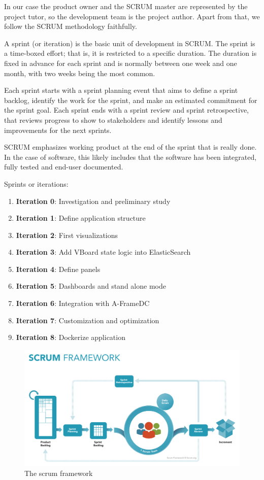 \documentclass[a4paper, 12pt]{book}
\begin{document}
In our case the product owner and the SCRUM master are represented by the project tutor, so the development team is the project author. Apart from that, we follow the SCRUM methodology faithfully.

A sprint (or iteration) is the basic unit of development in SCRUM. The sprint is a time-boxed effort; that is, it is restricted to a specific duration. The duration is fixed in advance for each sprint and is normally between one week and one month, with two weeks being the most common.

Each sprint starts with a sprint planning event that aims to define a sprint backlog, identify the work for the sprint, and make an estimated commitment for the sprint goal. Each sprint ends with a sprint review and sprint retrospective, that reviews progress to show to stakeholders and identify lessons and improvements for the next sprints.

SCRUM emphasizes working product at the end of the sprint that is really done. In the case of software, this likely includes that the software has been integrated, fully tested and end-user documented.

Sprints or iterations:
\begin{enumerate}
\item \textbf{Iteration 0}: Investigation and preliminary study
\item \textbf{Iteration 1}: Define application structure
\item \textbf{Iteration 2}: First visualizations
\item \textbf{Iteration 3}: Add VBoard state logic into ElasticSearch
\item \textbf{Iteration 4}: Define panels
\item \textbf{Iteration 5}: Dashboards and stand alone mode
\item \textbf{Iteration 6}: Integration with A-FrameDC
\item \textbf{Iteration 7}: Customization and optimization
\item \textbf{Iteration 8}: Dockerize application
\end{enumerate}

\begin{figure}[!htb]
  \centering
  \includegraphics[width=15cm, keepaspectratio]{img/development/SCRUM}
  \caption{The scrum framework}
  \label{fig:scrum}
\end{figure}
\end{document}
